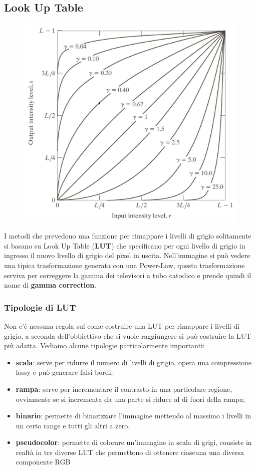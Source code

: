 \subsection{Look Up Table}
\begin{figure}
	\vspace{-.6cm}
	\centering
	\includegraphics[width=.9\linewidth]{Picture/Gamma_Trasformation}
\end{figure}
I metodi che prevedono una funzione per rimappare i livelli di grigio solitamente si basano su Look Up Table (\textbf{LUT}) che specificano per ogni livello di grigio in ingresso il nuovo livello di grigio del pixel in uscita. Nell'immagine si può vedere una tipica trasformazione generata con una Power-Law, questa trasformazione serviva per correggere la gamma dei televisori a tubo catodico e prende quindi il nome di \textbf{gamma correction}.

\subsubsection{Tipologie di LUT}
Non c'è nessuna regola sul come costruire una LUT per rimappare i livelli di grigio, a seconda dell'obbiettivo che si vuole raggiungere si può costruire la LUT più adatta. Vediamo alcune tipologie particolarmente importanti:
\begin{itemize}
	\item \textbf{scala}: serve per ridurre il numero di livelli di grigio, opera una compressione lossy e può generare falsi bordi;
	\item \textbf{rampa}: serve per incrementare il contrasto in una particolare regione, ovviamente se si incrementa da una parte si riduce al di fuori della rampa;
	\item \textbf{binario}: permette di binarizzare l'immagine mettendo al massimo i livelli in un certo range e tutti gli altri a zero.
	\item \textbf{pseudocolor}: permette di colorare un'immagine in scala di grigi, consiste in realtà in tre diverse LUT che permettono di ottenere ciascuna una diversa componente RGB
\end{itemize}

